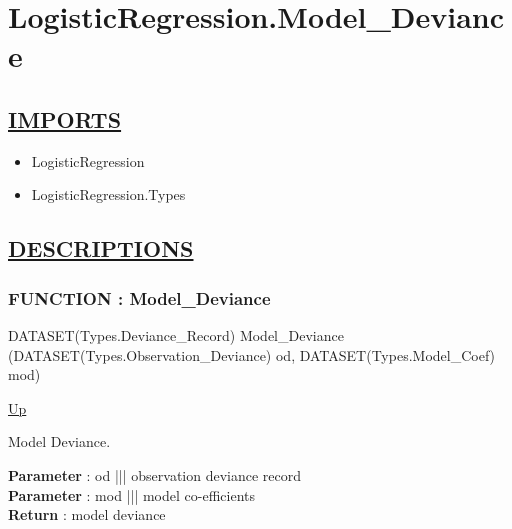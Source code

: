 \chapter*{LogisticRegression.Model\_Deviance}
\hypertarget{ecldoc:toc:LogisticRegression.Model_Deviance}{}

\section*{\underline{IMPORTS}}
\begin{itemize}
\item LogisticRegression
\item LogisticRegression.Types
\end{itemize}

\section*{\underline{DESCRIPTIONS}}
\subsection*{FUNCTION : Model\_Deviance}
\hypertarget{ecldoc:logisticregression.model_deviance}{}
\begin{minipage}[t]{\textwidth}
\begin{flushleft}
DATASET(Types.Deviance\_Record) Model\_Deviance (DATASET(Types.Observation\_Deviance) od, DATASET(Types.Model\_Coef) mod)
\end{flushleft}
\end{minipage}
\hyperlink{ecldoc:toc:LogisticRegression}{Up}

\par
Model Deviance.
\par
\textbf{Parameter} : od ||| observation deviance record \\
\textbf{Parameter} : mod ||| model co-efficients \\
\textbf{Return} : model deviance \\

